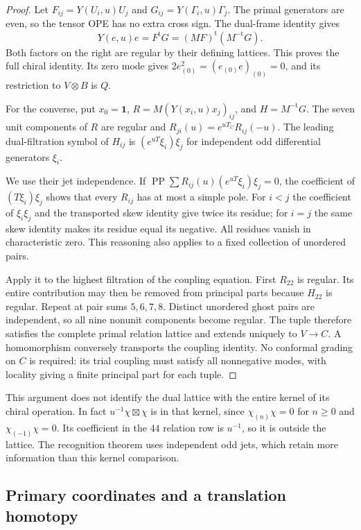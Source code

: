 \begin{proof}
Let $F_{ij}=Y(U_i,u)U_j$ and $G_{ij}=Y(\Gamma_i,u)\Gamma_j$.
The primal generators are even, so the tensor OPE has no extra cross
sign.  The dual-frame identity gives
\[
 Y(e,u)e=F^{\mathrm t}G=(MF)^{\mathrm t}(M^{-\mathrm t}G).
\]
Both factors on the right are regular by their defining lattices.
This proves the full chiral identity.  Its zero mode gives
$2e_{(0)}^2=(e_{(0)}e)_{(0)}=0$, and its restriction to
$V\otimes B$ is $Q$.

For the converse, put $x_0=\mathbf1$,
$R=M(Y(x_i,u)x_j)_{ij}$, and $H=M^{-\mathrm t}G$.
The seven unit components of $R$ are regular and
$R_{ji}(u)=e^{uT_C}R_{ij}(-u)$.
The leading dual-filtration symbol of $H_{ij}$ is
$(e^{uT}\xi_i)\xi_j$ for independent odd differential generators
$\xi_i$.

We use their jet independence.  If
$\operatorname{PP}\sum R_{ij}(u)(e^{uT}\xi_i)\xi_j=0$, the coefficient
of $(T\xi_i)\xi_j$ shows that every $R_{ij}$ has at most a simple
pole.  For $i<j$ the coefficient of $\xi_i\xi_j$ and the transported
skew identity give twice its residue; for $i=j$ the same skew identity
makes its residue equal its negative.  All residues vanish in
characteristic zero.  This reasoning also applies to a fixed collection
of unordered pairs.

Apply it to the highest filtration of the coupling equation.  First
$R_{22}$ is regular.  Its entire contribution may then be removed
from principal parts because $H_{22}$ is regular.  Repeat at pair sums
$5,6,7,8$.  Distinct unordered ghost pairs are independent, so all nine
nonunit components become regular.  The tuple therefore satisfies the
complete primal relation lattice and extends uniquely to $V\to C$.
A homomorphism conversely transports the coupling identity.  No
conformal grading on $C$ is required: its trial coupling must satisfy
all nonnegative modes, with locality giving a finite principal part
for each tuple.
\end{proof}

This argument does not identify the dual lattice with the entire kernel
of its chiral operation.  In fact $u^{-1}\chi\boxtimes\chi$ is in
that kernel, since $\chi_{(n)}\chi=0$ for $n\geq0$ and
$\chi_{(-1)}\chi=0$.  Its coefficient in the $44$ relation row is
$u^{-1}$, so it is outside the lattice.  The recognition theorem uses
independent odd jets, which retain more information than this kernel
comparison.

\subsection{Primary coordinates and a translation homotopy}

